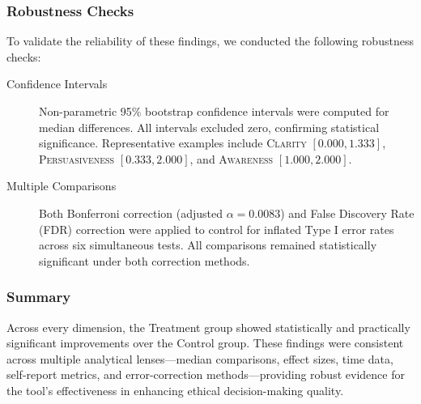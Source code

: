 \subsubsection*{Robustness Checks}

To validate the reliability of these findings, we conducted the following robustness checks:

\begin{description}
  \item[Confidence Intervals] Non-parametric 95\% bootstrap confidence intervals were computed for median differences. All intervals excluded zero, confirming statistical significance. Representative examples include \textsc{Clarity} $[0.000, 1.333]$, \textsc{Persuasiveness} $[0.333, 2.000]$, and \textsc{Awareness} $[1.000, 2.000]$.

  \item[Multiple Comparisons] Both Bonferroni correction (adjusted $\alpha = 0.0083$) and False Discovery Rate (FDR) correction were applied to control for inflated Type I error rates across six simultaneous tests. All comparisons remained statistically significant under both correction methods.
\end{description}

\subsubsection*{Summary}

Across every dimension, the Treatment group showed statistically and practically significant improvements over the Control group. These findings were consistent across multiple analytical lenses—median comparisons, effect sizes, time data, self-report metrics, and error-correction methods—providing robust evidence for the tool's effectiveness in enhancing ethical decision-making quality.

